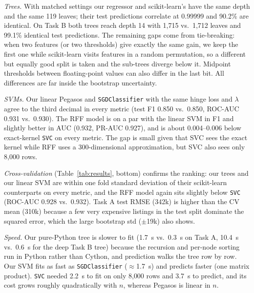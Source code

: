 \documentclass[10pt,twocolumn,a4paper]{article}
\begin{document}
\emph{Trees.} With matched settings our regressor and scikit-learn's have
the same depth and the same 119 leaves; their test predictions correlate at
0.99999 and 90.2\% are identical. On Task B both trees reach depth 14 with
1{,}715 vs.\ 1{,}712 leaves and 99.1\% identical test predictions. The
remaining gaps come from tie-breaking: when two features (or two thresholds)
give exactly the same gain, we keep the first one while scikit-learn visits
features in a random permutation, so a different but equally good split is
taken and the sub-trees diverge below it. Midpoint thresholds between
floating-point values can also differ in the last bit. All differences are
far inside the bootstrap uncertainty.

\emph{SVMs.} Our linear Pegasos and \texttt{SGDClassifier} with the same
hinge loss and $\lambda$ agree to the third decimal in every metric (test
F1 0.850 vs.\ 0.850, ROC-AUC 0.931 vs.\ 0.930). The RFF model is on a par
with the linear SVM in F1 and slightly better in AUC (0.932, PR-AUC 0.927),
and is about 0.004--0.006 below exact-kernel \texttt{SVC} on every metric.
The gap is small given that SVC sees the exact kernel while RFF uses a
300-dimensional approximation, but SVC also sees only 8{,}000 rows.

\emph{Cross-validation} (Table~\ref{tab:results}, bottom) confirms the
ranking: our trees and our linear SVM are within one fold standard
deviation of their scikit-learn counterparts on every metric, and the RFF
model again sits slightly below \texttt{SVC} (ROC-AUC 0.928 vs.\ 0.932). Task A test RMSE (342k) is higher than the CV
mean (310k) because a few very expensive listings in the test split
dominate the squared error, which the large bootstrap std ($\pm$19k) also
shows.

\emph{Speed.} Our pure-Python tree is slower to fit (1.7~s vs.\ 0.3~s on
Task A, 10.4~s vs.\ 0.6~s for the deep Task B tree) because the recursion
and per-node sorting run in Python rather than Cython, and prediction walks
the tree row by row. Our SVM fits as fast as \texttt{SGDClassifier}
($\approx$1.7~s) and predicts faster (one matrix product). \texttt{SVC}
needed 2.2~s to fit on only 8{,}000 rows and 3.7~s to predict, and its cost
grows roughly quadratically with $n$, whereas Pegasos is linear in $n$.
\end{document}
